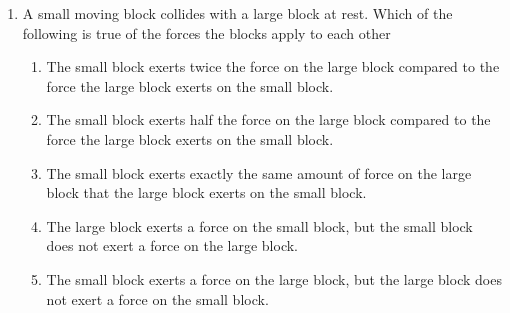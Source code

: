 \documentclass{../../oss-apphys}
\begin{document}
\begin{multicols}{2}
\begin{enumerate}[resume,leftmargin=18pt]
%    
%    
%
    \columnbreak
    
\item A small moving block collides with a large block at rest. Which of the
  following is true of the forces the blocks apply to each other
  \begin{enumerate}[noitemsep,topsep=0pt,leftmargin=18pt,label=(\Alph*)]
    \item The small block exerts twice the force on the large block
      compared to the force the large block exerts on the small block.
    \item The small block exerts half the force on the large block compared
      to the force the large block exerts on the small block.
    \item The small block exerts exactly the same amount of force on the
      large block that the large block exerts on the small block.
    \item The large block exerts a force on the small block, but the small
      block does not exert a force on the large block.
    \item The small block exerts a force on the large block, but the large
      block does not exert a force on the small block.
    \end{enumerate}
    

\end{enumerate}
\end{multicols}
\end{document}
